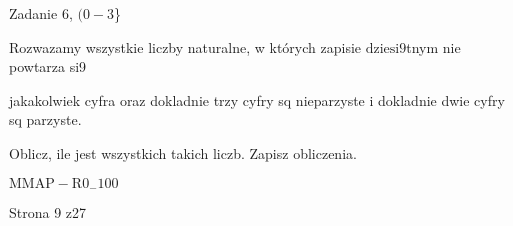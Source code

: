 \documentclass[a4paper,12pt]{article}
\begin{document}
Zadanie 6, $(0-3$\}

Rozwazamy wszystkie liczby naturalne, w których zapisie $\mathrm{d}\mathrm{z}\mathrm{i}\mathrm{e}\mathrm{s}\mathrm{i}9$tnym nie powtarza si9

jakakolwiek cyfra oraz dokladnie trzy cyfry sq nieparzyste i dokladnie dwie cyfry sq parzyste.

Oblicz, ile jest wszystkich takich liczb. Zapisz obliczenia.

$\mathrm{M}\mathrm{M}\mathrm{A}\mathrm{P}-\mathrm{R}0_{-}100$

Strona 9 z27
\end{document}
